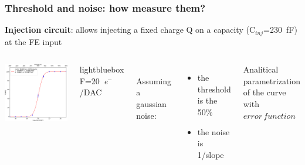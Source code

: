     \begin{frame}
        \frametitle{Threshold and noise: how measure them?}
        \textbf{Injection circuit}: allows injecting a fixed charge Q on a capacity (C$_{inj}$=\SI{230}{fF}) at the FE input
        \bigskip
        \begin{columns}
                  \includegraphics[width=1.1\linewidth]{figures/charaterization/scurve.pdf}
                \begin{beamercolorbox}[sep=0em,wd=0.45\textwidth,ht=1.5ex, dp=0.1ex, rounded=true, center]{lightbluebox}
                    F=\SI{20}{\elementarycharge}$^-$/DAC
                \end{beamercolorbox}
                \\
                \bigskip
                Assuming a gaussian noise:
                \begin{itemize}
                    \item the threshold is the 50\%
                    \item the noise is 1/slope 
                \end{itemize}
                \medskip
                Analitical parametrization of the curve with $error\,function$
        \end{columns}
    \end{frame}



